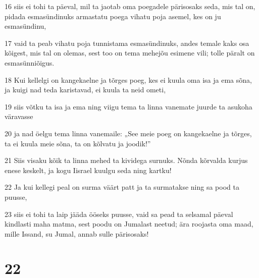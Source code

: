 \par 16 siis ei tohi ta päeval, mil ta jaotab oma poegadele pärisosaks seda, mis tal on, pidada esmasündinuks armastatu poega vihatu poja asemel, kes on ju esmasündinu,
\par 17 vaid ta peab vihatu poja tunnistama esmasündinuks, andes temale kaks osa kõigest, mis tal on olemas, sest too on tema mehejõu esimene vili; tolle päralt on esmasünniõigus.
\par 18 Kui kellelgi on kangekaelne ja tõrges poeg, kes ei kuula oma isa ja ema sõna, ja kuigi nad teda karistavad, ei kuula ta neid ometi,
\par 19 siis võtku ta isa ja ema ning viigu tema ta linna vanemate juurde ta asukoha väravasse
\par 20 ja nad öelgu tema linna vanemaile: „See meie poeg on kangekaelne ja tõrges, ta ei kuula meie sõna, ta on kõlvatu ja joodik!”
\par 21 Siis visaku kõik ta linna mehed ta kividega surnuks. Nõnda kõrvalda kurjus enese keskelt, ja kogu Iisrael kuulgu seda ning kartku!
\par 22 Ja kui kellegi peal on surma väärt patt ja ta surmatakse ning sa pood ta puusse,
\par 23 siis ei tohi ta laip jääda ööseks puusse, vaid sa pead ta selsamal päeval kindlasti maha matma, sest poodu on Jumalast neetud; ära roojasta oma maad, mille Issand, su Jumal, annab sulle pärisosaks!

\chapter{22}

